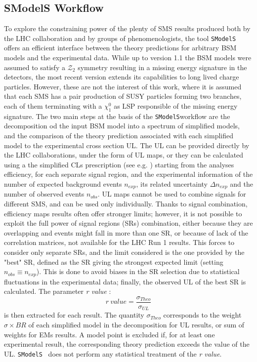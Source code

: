\documentclass[preprint,number,sort&compress,twocolumn,3p]{elsstyarticle}
\newcommand{\SMO}{\texttt{SModelS\xspace}}
\newcommand{\RVALUE}{\textit{r value}}
\begin{document}
\subsection{SModelS Workflow}
To explore the constraining power of the plenty of SMS results produced both by the LHC collaboration and by groups of phenomenologists, the tool \SMO \cite{Kraml:2013mwa,Ambrogi:2017neo,Ambrogi:2018ujg} offers an efficient interface between the theory predictions for arbitrary BSM models and the experimental data. While up to version 1.1 the BSM models were assumed to satisfy a $\mathcal{Z_2}$ symmetry resulting in a missing energy signature in the detectors, the most recent version extends its capabilities to long lived charge particles. However, these are not the interest of this work, where it is assumed that each SMS has a pair production of SUSY particles forming two branches, each of them terminating with a $\chi_1 ^0$ as LSP responsible of the missing energy signature.
%
The two main steps at the basis of the \SMO workflow are the decomposition od the input BSM model into a spectrum of simplified models, and the comparison of the theory prediction associated with each simplified model to the experimental cross section UL. The UL can be provided directly by the LHC collaborations, under the form of UL maps, or they can be calculated using a the simplified CLs prescription (see e.g. \cite{Read:2002hq,Junk:1999kv}) starting from the analyses efficiency, for each separate signal region, and the experimental information of the number of expected background events $n_{exp}$, its related uncertainty $\Delta n_{exp}$ and the number of observed events $n_{obs}$. UL maps cannot be used to combine signals for different SMS, and can be used only individually. Thanks to signal combination, efficiency maps results often offer stronger limits; however, it is not possible to exploit the full power of signal regions (SRs) combination, either because they are overlapping and events might fall in more than one SR, or because of lack of the correlation matrices, not available for the LHC Run 1 results. This forces to consider only separate SRs, and the limit considered is the one provided by the "best" SR, defined as the SR giving the strongest expected limit (setting $n_{obs}\equiv n_{exp}$). This is done to avoid biases in the SR selection due to statistical fluctuations in the experimental data; finally, the observed UL of the best SR is calculated. The parameter \textit{r value }:
\begin{equation}\label{rvalue}
r \ value = \frac{\sigma_{Theo}}{\sigma_{UL}}
\end{equation}
is then extracted for each result. 
The quantity $\sigma_{Theo}$ corresponds to the weight $\sigma \times BR$ of each simplified model in the decomposition for UL results, or sum of weights for EMs results. A model point is excluded if, for at least one experimental result, the corresponding theory prediction exceeds the value of the UL. \SMO~ does not perform any statistical treatment of the \RVALUE.
%
\end{document}
